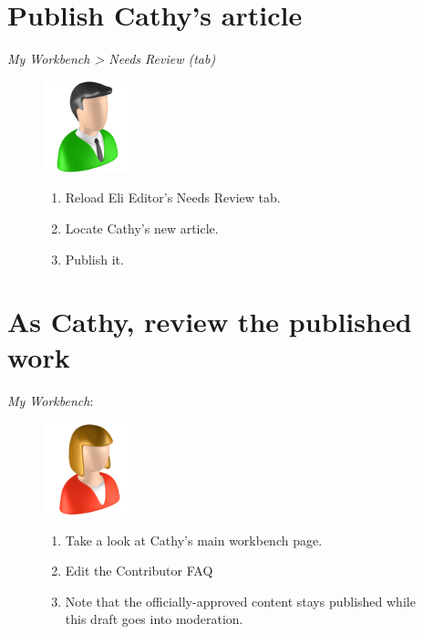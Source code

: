 \documentclass[letterpaper,10pt,english]{sphinxmanual}
\begin{document}
\section{Publish Cathy's article}
\label{moderation:publish-cathy-s-article}
\emph{My Workbench \textgreater{} Needs Review (tab)}
\begin{figure}[htbp]
\centering

\includegraphics{sites/default/files/recipes/user_icons/editor.png}
{\small \begin{enumerate}
\item {} 
Reload Eli Editor's Needs Review tab.

\item {} 
Locate Cathy's new article.

\item {} 
Publish it.

\end{enumerate}
}\end{figure}


\section{As Cathy, review the published work}
\label{moderation:as-cathy-review-the-published-work}
\emph{My Workbench}:
\begin{figure}[htbp]
\centering

\includegraphics{sites/default/files/recipes/user_icons/contributor.png}
{\small \begin{enumerate}
\item {} 
Take a look at Cathy's main workbench page.

\item {} 
Edit the Contributor FAQ

\item {} 
Note that the officially-approved content stays published while this draft goes into moderation.

\end{enumerate}
}\end{figure}
\end{document}
